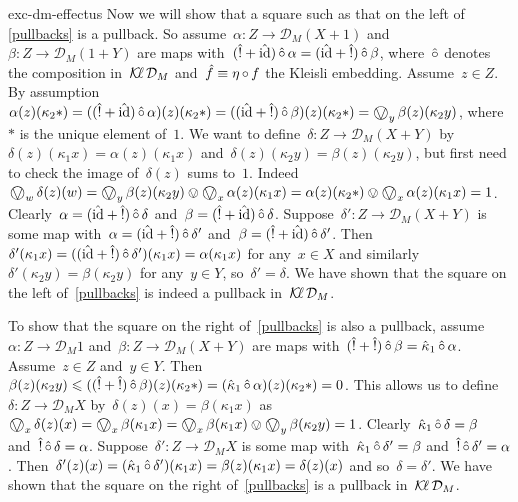 \begin{solution}{exc-dm-effectus}
Now we will show that a square such as that on the
    left of \eqref{pullbacks} is a pullback.
So assume~$\alpha \colon Z \to \mathcal{D}_M (X+1)$
    and~$\beta\colon Z \to \mathcal{D}_M (1+Y)$
        are maps with~$(\hat !+\hat{\mathrm{id}}) \mathop{\hat\circ} \alpha = (\hat{\mathrm{id}}+\hat!) \mathop{\hat\circ} \beta$,
        where~$\mathop{\hat\circ}$ denotes the composition in~$\operatorname{\mathcal{K}\!\ell} \mathcal{D}_M$
        and~$\hat f \equiv \eta \mathop{\circ} f$ the Kleisli embedding.
Assume~$z \in Z$.
By assumption~$ \alpha(z) (\kappa_2*)
                = ((\hat! + \hat\id) \hafter \alpha) (z) (\kappa_2 *)
                = ((\hat\id + \hat!) \hafter \beta) (z) (\kappa_2 *)
                = \bigovee_y \beta(z)(\kappa_2 y) $,
                    where~$*$ is the unique element of~$1$.
We want to define~$\delta\colon Z \to \mathcal{D}_M (X+Y)$
    by~$\delta(z)(\kappa_1 x) = \alpha(z)(\kappa_1 x)$
        and~$\delta(z)(\kappa_2 y) = \beta(z)(\kappa_2 y)$,
            but first need to check the image of~$\delta(z)$ sums to~$1$.
Indeed~$\bigovee_w \delta(z)(w)
    = \bigovee_y \beta(z)(\kappa_2 y)
    \ovee \bigovee_x \alpha(z)(\kappa_1 x)
    = \alpha(z)(\kappa_2*)
    \ovee \bigovee_x \alpha(z)(\kappa_1 x)
    = 1$.
Clearly~$\alpha = (\hat{\mathrm{id}}+\hat!) \mathop{\hat\circ} \delta $
    and~$\beta = (\hat!+\hat{\mathrm{id}})\mathop{\hat\circ} \delta$.
Suppose~$\delta'\colon Z \to \mathcal{D}_M (X+Y)$
    is some map with~$\alpha = (\hat{\mathrm{id}}+\hat!) \mathop{\hat\circ} \delta'$
        and~$\beta = (\hat!+\hat{\mathrm{id}}) \mathop{\hat\circ} \delta'$.
    Then~$\delta'(\kappa_1 x)
        = ((\hat{\mathrm{id}} + \hat!) \mathop{\hat\circ} \delta')(\kappa_1 x)
        = \alpha(\kappa_1 x)$ for any~$x \in X$
        and similarly~$\delta'(\kappa_2 y)
        = \beta(\kappa_2 y)$ for any~$y \in Y$, so~$\delta' = \delta$.
We have shown that the square on the left of~\eqref{pullbacks}
    is indeed a pullback in~$\operatorname{\mathcal{K}\!\ell} \mathcal{D}_M$.

To show that the square on the right of~\eqref{pullbacks}
    is also a pullback, assume~$\alpha\colon Z \to \mathcal{D}_M 1$
        and~$\beta\colon Z \to \mathcal{D}_M (X+Y)$
            are maps with~$(\hat!+\hat!) \mathop{\hat\circ} \beta = \hat\kappa_1 \mathop{\hat\circ} \alpha$.
    Assume~$z \in Z$ and~$y \in Y$.
    Then~$\beta(z)(\kappa_2 y) 
                \leqslant ((\hat!+\hat!) \mathop{\hat\circ} \beta)(z)(\kappa_2 *)
                = (\hat\kappa_1 \mathop{\hat\circ} \alpha)(z)(\kappa_2 *)
                = 0 $.
This allows us to define~$\delta \colon Z \to \mathcal{D}_M X$
        by~$\delta(z)(x) = \beta(\kappa_1 x)$
        as~$\bigovee_x \delta(z)(x)
                = \bigovee_x \beta(\kappa_1 x)
                = \bigovee_x \beta(\kappa_1 x)
                 \ovee \bigovee_y \beta(\kappa_2 y) = 1$.
    Clearly~$\hat\kappa_1 \mathop{\hat\circ} \delta = \beta$
        and~$\hat! \mathop{\hat\circ} \delta = \alpha$.
Suppose~$\delta' \colon Z \to \mathcal{D}_M X$ is some map
    with~$\hat\kappa_1 \mathop{\hat\circ} \delta' = \beta$
        and~$\hat! \mathop{\hat\circ} \delta' = \alpha$.
    Then~$\delta'(z)(x) = (\hat\kappa_1 \mathop{\hat\circ} \delta')(\kappa_1 x)
        = \beta(z)(\kappa_1 x) = \delta(z)(x)$
        and so~$\delta = \delta'$.
We have shown that the square on the right of~\eqref{pullbacks}
    is a pullback in~$\operatorname{\mathcal{K}\!\ell} \mathcal{D}_M$.


\end{solution}
